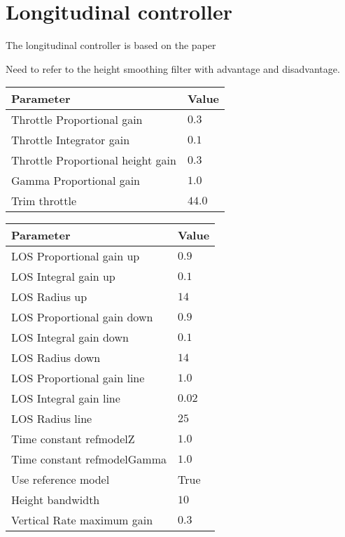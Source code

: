 \section{Longitudinal controller}
The longitudinal controller is based on the paper \citep{you2012guidance}

Need to refer to the height smoothing filter with advantage and disadvantage.

\begin{table}
\centering
\begin{tabular}{| l | l |}
\hline
\textbf{Parameter}	&	\textbf{Value} \\ \hline
Throttle Proportional gain          &    $0.3$ \\ \hline
Throttle Integrator gain            &    $0.1$ \\ \hline
Throttle Proportional height gain   &    $0.3$ \\ \hline
Gamma Proportional gain             &    $1.0$ \\ \hline
Trim throttle                       &    $44.0$ \\ \hline
\end{tabular}
\end{table}

\begin{table}
\centering
\begin{tabular}{| l | l |}
\hline
\textbf{Parameter}	&	\textbf{Value} \\ \hline
LOS Proportional gain up        &        $0.9$ \\ \hline
LOS Integral gain up            &        $0.1$ \\ \hline
LOS Radius up                   &        $14$ \\ \hline
LOS Proportional gain down       &       $0.9$ \\ \hline
LOS Integral gain down          &        $0.1$ \\ \hline
LOS Radius down                  &       $14$ \\ \hline
LOS Proportional gain line      &        $1.0$ \\ \hline
LOS Integral gain line          &        $0.02$ \\ \hline
LOS Radius line                &         $25$ \\ \hline
Time constant refmodelZ         &        $1.0$ \\ \hline
Time constant refmodelGamma     &        $1.0$ \\ \hline
Use reference model             &        True \\ \hline
Height bandwidth               &        $10$ \\ \hline
Vertical Rate maximum gain      &        $0.3$ \\ \hline
\end{tabular}
\end{table}